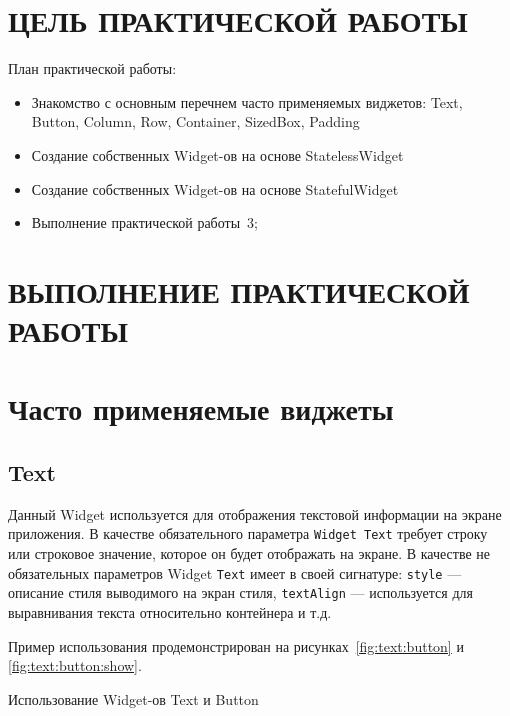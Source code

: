 \section*{ЦЕЛЬ ПРАКТИЧЕСКОЙ РАБОТЫ}

План практической работы:
\begin{itemize}
	\item Знакомство с основным перечнем часто применяемых виджетов:
		Text, Button, Column, Row, Container, SizedBox, Padding
	\item Создание собственных Widget-ов на основе StatelessWidget
	\item Создание собственных Widget-ов на основе StatefulWidget
	\item Выполнение практической работы \No\,3;
\end{itemize}

\clearpage

\section*{ВЫПОЛНЕНИЕ ПРАКТИЧЕСКОЙ РАБОТЫ}

\section{Часто применяемые виджеты}

\subsection{Text}

Данный Widget используется для отображения текстовой информации
на экране приложения. В качестве обязательного параметра \texttt{Widget Text} 
требует строку или строковое значение, которое он будет отображать на экране.
В качестве не обязательных параметров Widget \texttt{Text} имеет
в своей сигнатуре: \texttt{style} --- описание стиля выводимого на экран стиля,
\texttt{textAlign} --- используется
для выравнивания текста относительно контейнера и т.д.

Пример использования продемонстрирован
на рисунках~\ref{fig:text:button} и \ref{fig:text:button:show}.

\begin{image}
	\caption{Использование Widget-ов Text и Button}
	\label{fig:text:button}
\end{image}

